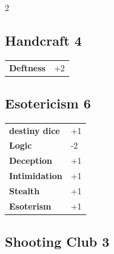 \begin{multicols}{2}
\begin{tcolorbox}

\end{tcolorbox}

\begin{tcolorbox}
    \subsection*{Handcraft \hfill \small{4 }}
    \tcblower




\begin{tabular}{@{}ll@{}}
    \textbf{Deftness} & +2\\
\end{tabular}


\end{tcolorbox}

\begin{tcolorbox}
    \subsection*{Esotericism \hfill \small{6 }}
    \tcblower




\begin{tabular}{@{}ll@{}}
    \textbf{destiny dice} & +1\\
    \textbf{Logic} & -2\\
    \textbf{Deception} & +1\\
    \textbf{Intimidation} & +1\\
    \textbf{Stealth} & +1\\
    \textbf{Esoterism} & +1\\
\end{tabular}


\end{tcolorbox}

\begin{tcolorbox}
    \subsection*{Shooting Club \hfill \small{3 }}
    \tcblower





\end{tcolorbox}
\end{multicols}
